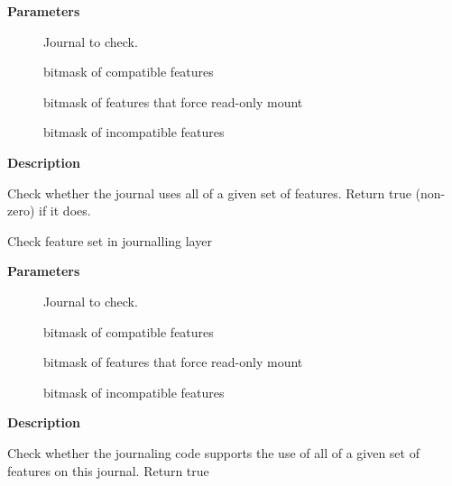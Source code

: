 \documentclass[a4paper,8pt,english]{sphinxmanual}
\begin{document}
\textbf{Parameters}
\begin{description}
\item[{}] \leavevmode
Journal to check.

\item[{}] \leavevmode
bitmask of compatible features

\item[{}] \leavevmode
bitmask of features that force read-only mount

\item[{}] \leavevmode
bitmask of incompatible features

\end{description}

\textbf{Description}

Check whether the journal uses all of a given set of
features.  Return true (non-zero) if it does.

\begin{fulllineitems}
\label{filesystems/index:c.jbd2_journal_check_available_features}
Check feature set in journalling layer

\end{fulllineitems}


\textbf{Parameters}
\begin{description}
\item[{}] \leavevmode
Journal to check.

\item[{}] \leavevmode
bitmask of compatible features

\item[{}] \leavevmode
bitmask of features that force read-only mount

\item[{}] \leavevmode
bitmask of incompatible features

\end{description}

\textbf{Description}

Check whether the journaling code supports the use of
all of a given set of features on this journal.  Return true
\end{document}
